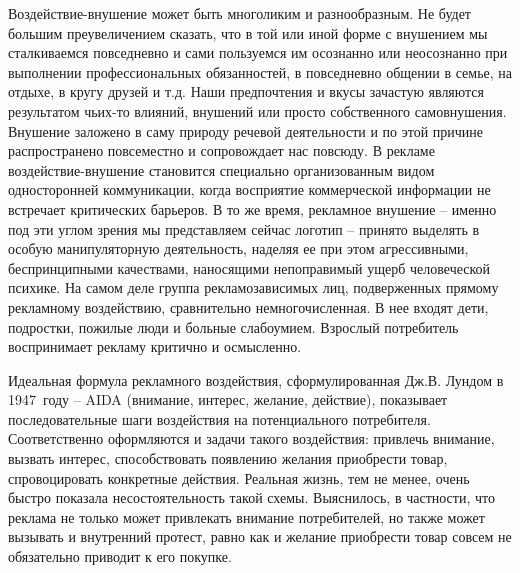 Воздействие-внушение может быть многоликим и разнообразным. Не будет большим
преувеличением сказать, что в той или иной форме с внушением мы сталкиваемся
повседневно и сами пользуемся им осознанно или неосознанно при выполнении
профессиональных обязанностей, в повседневно общении в семье, на отдыхе, в
кругу друзей и т.д. Наши предпочтения и вкусы зачастую являются результатом
чьих-то влияний, внушений или просто собственного самовнушения. Внушение
заложено в саму природу речевой деятельности и по этой причине распространено
повсеместно и сопровождает нас повсюду. В рекламе воздействие-внушение становится
специально организованным видом односторонней коммуникации, когда восприятие
коммерческой информации не встречает критических барьеров. В то же время,
рекламное внушение -- именно под эти углом зрения мы представляем сейчас
логотип -- принято выделять в особую манипуляторную деятельность, наделяя ее
при этом агрессивными, беспринципными качествами, наносящими непоправимый ущерб
человеческой психике. На самом деле группа рекламозависимых лиц, подверженных
прямому рекламному воздействию, сравнительно немногочисленная. В нее входят
дети, подростки, пожилые люди и больные слабоумием. Взрослый потребитель
воспринимает рекламу критично и осмысленно\autocite{roblesconsumer}.

Идеальная формула рекламного воздействия, сформулированная Дж.В. Лундом в
1947~году -- AIDA (внимание, интерес, желание, действие), показывает
последовательные шаги воздействия на потенциального потребителя. Соответственно
оформляются и задачи такого воздействия: привлечь внимание, вызвать интерес,
способствовать появлению желания приобрести товар, спровоцировать конкретные
действия\autocite{lund1947newspaper}. Реальная жизнь, тем не менее, очень быстро
показала несостоятельность такой схемы. Выяснилось, в частности, что реклама
не только может привлекать внимание потребителей, но также может вызывать и
внутренний протест, равно как и желание приобрести товар совсем не обязательно
приводит к его покупке.

